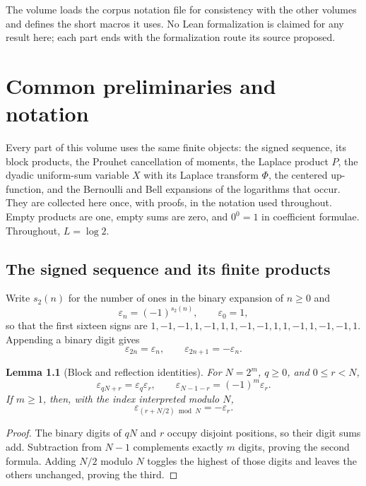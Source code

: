 \documentclass[11pt,a4paper,oneside,openany]{book}
\numberwithin{equation}{chapter}
\newtheorem{lemma}[theorem]{Lemma}
\theoremstyle{definition}
\theoremstyle{remark}
\newcommand{\eps}{\varepsilon}
\begin{document}
The volume loads the corpus notation file 
for consistency with the other volumes and defines the short macros it uses.
No Lean formalization is claimed for any result here; each part ends with the
formalization route its source proposed.
\begingroup
\small
\tableofcontents
\endgroup

\mainmatter


\chapter{Common preliminaries and notation}
\label{ch:prelim}
Every part of this volume uses the same finite objects: the signed sequence,
its block products, the Prouhet cancellation of moments, the Laplace product
$P$, the dyadic uniform-sum variable $X$ with its Laplace transform $\Phi$,
the centered up-function, and the Bernoulli and Bell expansions of the
logarithms that occur. They are collected here once, with proofs, in the
notation used throughout. Empty products are one, empty sums are zero, and
$0^0=1$ in coefficient formulae. Throughout, $L=\log2$.

\section{The signed sequence and its finite products}
Write $s_2(n)$ for the number of ones in the binary expansion of $n\ge0$ and
\begin{equation}\label{tm:eq:eps}
 \eps_n=(-1)^{s_2(n)},\qquad \eps_0=1,
\end{equation}
so that the first sixteen signs are
$1,-1,-1,1,-1,1,1,-1,-1,1,1,-1,1,-1,-1,1$. Appending a binary digit gives
\begin{equation}\label{tm:eq:binary}
 \eps_{2n}=\eps_n,\qquad \eps_{2n+1}=-\eps_n.
\end{equation}

\begin{lemma}[Block and reflection identities]
For \(N=2^m\), \(q\ge0\), and \(0\le r<N\),
\begin{equation}
 \eps_{qN+r}=\eps_q\eps_r,
 \qquad
 \eps_{N-1-r}=(-1)^m\eps_r.
 \label{nd:eq:blocks}
\end{equation}
If \(m\ge1\), then, with the index interpreted modulo \(N\),
\begin{equation}
 \eps_{(r+N/2)\bmod N}=-\eps_r.
 \label{nd:eq:halfperiod}
\end{equation}
\end{lemma}
\begin{proof}
The binary digits of \(qN\) and \(r\) occupy disjoint positions, so their digit
sums add. Subtraction from \(N-1\) complements exactly \(m\) digits, proving the
second formula. Adding \(N/2\) modulo \(N\) toggles the highest of those digits
and leaves the others unchanged, proving the third.
\end{proof}
\end{document}
